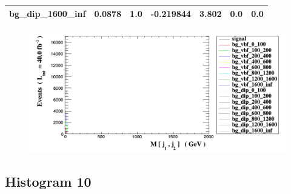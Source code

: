\documentclass[a4paper, 10pt]{article}
\begin{document}
\begin{table}[H]
\begin{center}
\begin{tabular}{|m{23.0mm}|m{23.0mm}|m{18.0mm}|m{19.0mm}|m{19.0mm}|m{19.0mm}|m{19.0mm}|}
      \hline
      {\cellcolor{white}         bg\_dip\_1600\_inf}& {\cellcolor{white}         0.0878}& {\cellcolor{white}         1.0}& {\cellcolor{white}         -0.219844}& {\cellcolor{white}         3.802}& {\cellcolor{green}         0.0}& {\cellcolor{green}         0.0}\\
\hline
    \end{tabular}
  \end{center}
\end{table}

\begin{figure}[H]
  \begin{center}
    \includegraphics[scale=0.45]{selection_8.png}\\
\caption{   }
  \end{center}
\end{figure}
      \newpage
\subsection{ Histogram 10}
\end{document}
